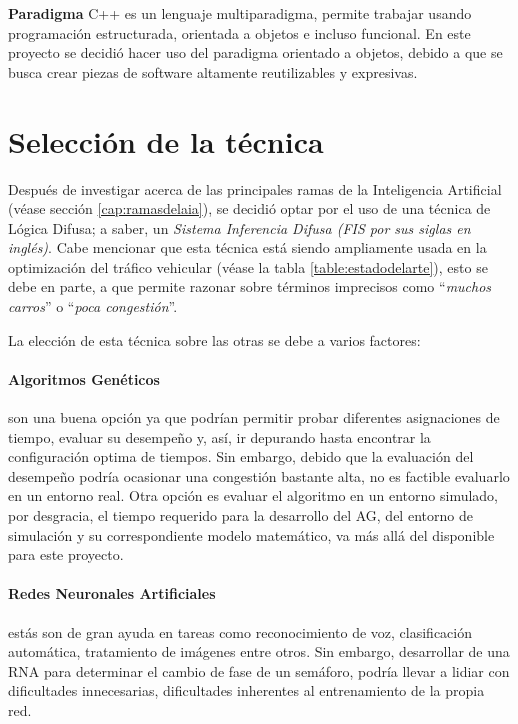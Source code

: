 \textbf{Paradigma} C++ es un lenguaje multiparadigma, permite trabajar usando programación estructurada, orientada a objetos e incluso funcional. En este proyecto se decidió hacer uso del paradigma orientado a objetos, debido a que se busca crear piezas de software altamente reutilizables y expresivas.

\section{Selección de la técnica}\label{section:selecciontecnica}
Después de investigar acerca de las principales ramas de la Inteligencia Artificial (véase sección \ref{cap:ramasdelaia}), se decidió optar por el uso de una técnica de Lógica Difusa; a saber, un \emph{Sistema Inferencia Difusa (FIS por sus siglas en inglés)}. Cabe mencionar que esta técnica está siendo ampliamente usada en la optimización del tráfico vehicular (véase la tabla \ref{table:estadodelarte}), esto se debe en parte, a que permite razonar sobre términos imprecisos como ``\emph{muchos carros}'' o ``\emph{poca congestión}''.

La elección de esta técnica sobre las otras se debe a varios factores: 

\paragraph{Algoritmos Genéticos} son una buena opción ya que podrían permitir probar diferentes asignaciones de tiempo, evaluar su desempeño y, así, ir depurando hasta encontrar la configuración optima de tiempos. Sin embargo, debido que la evaluación del desempeño podría ocasionar una congestión bastante alta, no es factible evaluarlo en un entorno real. Otra opción es evaluar el algoritmo en un entorno simulado, por desgracia, el tiempo requerido para la desarrollo del AG, del entorno de simulación y su correspondiente modelo matemático, va más allá del disponible para este proyecto.

\paragraph{Redes Neuronales Artificiales} estás son de gran ayuda en tareas como reconocimiento de voz, clasificación automática, tratamiento de imágenes entre otros. Sin embargo, desarrollar de una RNA para determinar el cambio de fase de un semáforo, podría llevar a lidiar con dificultades innecesarias, dificultades inherentes al entrenamiento de la propia red.

